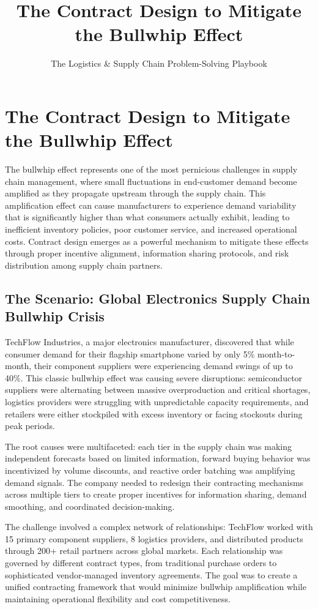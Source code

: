 \documentclass{article}
\title{The Contract Design to Mitigate the Bullwhip Effect}
\author{The Logistics \& Supply Chain Problem-Solving Playbook}
\date{}
\begin{document}
\maketitle

\section{The Contract Design to Mitigate the Bullwhip Effect}

The bullwhip effect represents one of the most pernicious challenges in supply chain management, where small fluctuations in end-customer demand become amplified as they propagate upstream through the supply chain. This amplification effect can cause manufacturers to experience demand variability that is significantly higher than what consumers actually exhibit, leading to inefficient inventory policies, poor customer service, and increased operational costs. Contract design emerges as a powerful mechanism to mitigate these effects through proper incentive alignment, information sharing protocols, and risk distribution among supply chain partners.

\subsection{The Scenario: Global Electronics Supply Chain Bullwhip Crisis}

TechFlow Industries, a major electronics manufacturer, discovered that while consumer demand for their flagship smartphone varied by only 5\% month-to-month, their component suppliers were experiencing demand swings of up to 40\%. This classic bullwhip effect was causing severe disruptions: semiconductor suppliers were alternating between massive overproduction and critical shortages, logistics providers were struggling with unpredictable capacity requirements, and retailers were either stockpiled with excess inventory or facing stockouts during peak periods.

The root causes were multifaceted: each tier in the supply chain was making independent forecasts based on limited information, forward buying behavior was incentivized by volume discounts, and reactive order batching was amplifying demand signals. The company needed to redesign their contracting mechanisms across multiple tiers to create proper incentives for information sharing, demand smoothing, and coordinated decision-making.

The challenge involved a complex network of relationships: TechFlow worked with 15 primary component suppliers, 8 logistics providers, and distributed products through 200+ retail partners across global markets. Each relationship was governed by different contract types, from traditional purchase orders to sophisticated vendor-managed inventory agreements. The goal was to create a unified contracting framework that would minimize bullwhip amplification while maintaining operational flexibility and cost competitiveness.
\end{document}
